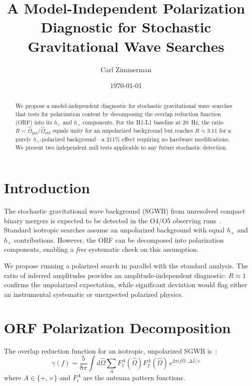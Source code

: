 \documentclass[twocolumn,prd,superscriptaddress,nofootinbib]{revtex4-2}
\begin{document}
\title{A Model-Independent Polarization Diagnostic for Stochastic Gravitational Wave Searches}

\author{Carl Zimmerman}

\date{\today}

\begin{abstract}
We propose a model-independent diagnostic for stochastic gravitational wave searches that tests for polarization content by decomposing the overlap reduction function (ORF) into its $h_+$ and $h_\times$ components. For the H1-L1 baseline at 20~Hz, the ratio $R = \hat{\Omega}_{\mathrm{pol}} / \hat{\Omega}_{\mathrm{std}}$ equals unity for an unpolarized background but reaches $R \approx 3.11$ for a purely $h_+$-polarized background---a 211\% effect requiring no hardware modifications. We present two independent null tests applicable to any future stochastic detection.
\end{abstract}

\maketitle

\section{Introduction}

The stochastic gravitational wave background (SGWB) from unresolved compact binary mergers is expected to be detected in the O4/O5 observing runs~\cite{KAGRA:2021kbb}. Standard isotropic searches assume an unpolarized background with equal $h_+$ and $h_\times$ contributions. However, the ORF can be decomposed into polarization components, enabling a \emph{free} systematic check on this assumption.

We propose running a polarized search in parallel with the standard analysis. The ratio of inferred amplitudes provides an amplitude-independent diagnostic: $R \approx 1$ confirms the unpolarized expectation, while significant deviation would flag either an instrumental systematic or unexpected polarized physics.

\section{ORF Polarization Decomposition}

The overlap reduction function for an isotropic, unpolarized SGWB is~\cite{Flanagan:1993ix,Allen:1997ad}:
\begin{equation}
\gamma(f) = \frac{5}{8\pi} \int d\hat{\Omega} \sum_{A} F_1^A(\hat{\Omega}) F_2^A(\hat{\Omega}) \, e^{2\pi i f \hat{\Omega} \cdot \Delta \vec{x}/c}
\end{equation}
where $A \in \{+, \times\}$ and $F_i^A$ are the antenna pattern functions.
\end{document}
